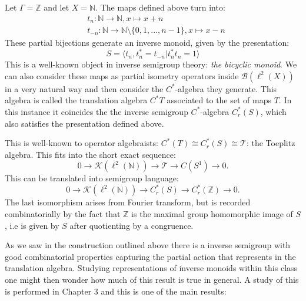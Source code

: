 \begin{example}\label{Ex:Int2}
Let $\Gamma=\mathbb{Z}$ and let $X=\mathbb{N}$. The maps defined above turn into:
\begin{eqnarray*}
& t_{n}: \mathbb{N} \rightarrow \mathbb{N}, x \mapsto x+n \\
&t_{-n}: \mathbb{N} \rightarrow \mathbb{N}\setminus \lbrace 0,1,...,n-1 \rbrace , x \mapsto x-n
\end{eqnarray*} 
These partial bijections generate an inverse monoid, given by the presentation:
\begin{equation*}
S=\langle t_{n},t_{n}^{*}=t_{-n} | t_{n}^{*}t_{n}=1 \rangle
\end{equation*}
This is a well-known object in inverse semigroup theory: \textit{the bicyclic monoid}. We can also consider these maps as partial isometry operators inside $\mathcal{B}(\ell^{2}(X))$ in a very natural way and then consider the $C^{*}$-algebra they generate. This algebra is called the translation algebra $C^{*}T$ associated to the set of maps $T$. In this instance it coincides the the inverse semigroup $C^{*}$-algebra $C^{*}_{r}(S)$, which also satisfies the presentation defined above.

This is well-known to operator algebraists: $C^{*}(T)\cong C^{*}_{r}(S) \cong \mathcal{T}$: the Toeplitz algebra. This fits into the short exact sequence:
\begin{equation*}
0 \rightarrow \mathcal{K}(\ell^{2}(\mathbb{N})) \rightarrow \mathcal{T} \rightarrow C(S^{1}) \rightarrow 0.
\end{equation*}
This can be translated into semigroup language:
\begin{equation*}
0 \rightarrow \mathcal{K}(\ell^{2}(\mathbb{N})) \rightarrow C^{*}_{r}(S) \rightarrow C^{*}_{r}(\mathbb{Z}) \rightarrow 0.
\end{equation*}
The last isomorphism arises from Fourier transform, but is recorded combinatorially by the fact that $\mathbb{Z}$ is the maximal group homomorphic image of $S$, i.e is given by $S$ after quotienting by a congruence. 
\end{example}

As we saw in the construction outlined above there is a inverse semigroup with good combinatorial properties capturing the partial action that represents in the translation algebra. Studying representations of inverse monoids within this class one might then wonder how much of this result is true in general. A study of this is performed in Chapter 3 and this is one of the main results:

